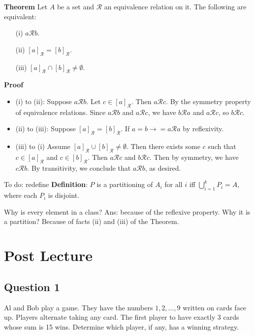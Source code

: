 \documentclass{article}
\begin{document}
    \textbf{Theorem} Let $A$ be a set and $\mathcal{R}$ an equivalence relation on it. The following are equivalent:
    \begin{itemize}
        \item[(i)] $a\mathcal{R}b$.
        \item[(ii)] $[a]_{\mathcal{R}}=[b]_{\mathcal{R}}$.
        \item[(iii)] $[a]_{\mathcal{R}}\cap [b]_{\mathcal{R}}\neq \emptyset$.
    \end{itemize}
    
    \textbf{Proof} 
    \begin{itemize}
        \item (i) to (ii): Suppose $a \mathcal{R} b$. Let $c \in [a]_{\mathcal{R}}$. Then $a \mathcal{R} c$. By the symmetry property of equivalence relations. Since $a \mathcal{R} b$ and $a \mathcal{R} c$, we have $b \mathcal{R} a$ and $a \mathcal{R} c$, so $b \mathcal{R} c$.
        \item (ii) to (iii): Suppose $[a]_{\mathcal{R}}=[b]_{\mathcal{R}}$. If $a = b \rightarrow = a \mathcal{R} a$ by reflexivity.
        \item (iii) to (i) Assume $[a]_{\mathcal{R}} \cup [b]_{\mathcal{R}} \ne \emptyset$. Then there exists some $c$ such that $c \in [a]_{\mathcal{R}}$ and $c \in [b]_{\mathcal{R}}$. Then $a \mathcal{R} c$ and $b \mathcal{R} c$. Then by symmetry, we have $c \mathcal{R} b$. By transitivity, we conclude that $a \mathcal{R} b$, as desired.
    \end{itemize}
    
    To do: redefine
    \vspace{1.5mm}
    \textbf{Definition}: $P$ is a partitioning of $A_{i}$ for all $i$ iff $\bigcup_{i = 1}^{k} P_{i} = A$, where each $P_{i}$ is disjoint.
    
     Why is every element in a class? Ans: because of the reflexive property. Why it is a partition? Because of facts (ii) and (iii) of the Theorem.

\section*{Post Lecture}

\subsection*{Question 1}
    Al and Bob play a game. They have the numbers $1,2,\dots, 9$ written on cards face up. Players alternate taking any card. The first player to have exactly 3 cards whose sum is 15 wins. Determine which player, if any, has a winning strategy.
    
\end{document}
